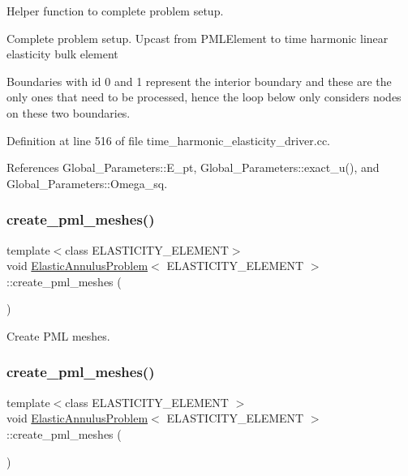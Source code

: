 Helper function to complete problem setup. 

Complete problem setup. Upcast from P\+M\+L\+Element to time harmonic linear elasticity bulk element

Boundaries with id 0 and 1 represent the interior boundary and these are the only ones that need to be processed, hence the loop below only considers nodes on these two boundaries. 

Definition at line 516 of file time\+\_\+harmonic\+\_\+elasticity\+\_\+driver.\+cc.



References Global\+\_\+\+Parameters\+::\+E\+\_\+pt, Global\+\_\+\+Parameters\+::exact\+\_\+u(), and Global\+\_\+\+Parameters\+::\+Omega\+\_\+sq.

\mbox{\label{classElasticAnnulusProblem_a0d2b0cc613caaca7c8f1a78c80b40bc7}} 
\subsubsection{\texorpdfstring{create\+\_\+pml\+\_\+meshes()}{create\_pml\_meshes()}\hspace{0.1cm}{\footnotesize\ttfamily [1/2]}}
{\footnotesize\ttfamily template$<$class E\+L\+A\+S\+T\+I\+C\+I\+T\+Y\+\_\+\+E\+L\+E\+M\+E\+NT$>$ \\
void \hyperlink{classElasticAnnulusProblem}{Elastic\+Annulus\+Problem}$<$ E\+L\+A\+S\+T\+I\+C\+I\+T\+Y\+\_\+\+E\+L\+E\+M\+E\+NT $>$\+::create\+\_\+pml\+\_\+meshes (\begin{DoxyParamCaption}{ }\end{DoxyParamCaption})}



Create P\+ML meshes. 

\mbox{\label{classElasticAnnulusProblem_a0d2b0cc613caaca7c8f1a78c80b40bc7}} 
\subsubsection{\texorpdfstring{create\+\_\+pml\+\_\+meshes()}{create\_pml\_meshes()}\hspace{0.1cm}{\footnotesize\ttfamily [2/2]}}
{\footnotesize\ttfamily template$<$class E\+L\+A\+S\+T\+I\+C\+I\+T\+Y\+\_\+\+E\+L\+E\+M\+E\+NT $>$ \\
void \hyperlink{classElasticAnnulusProblem}{Elastic\+Annulus\+Problem}$<$ E\+L\+A\+S\+T\+I\+C\+I\+T\+Y\+\_\+\+E\+L\+E\+M\+E\+NT $>$\+::create\+\_\+pml\+\_\+meshes (\begin{DoxyParamCaption}{ }\end{DoxyParamCaption})}



